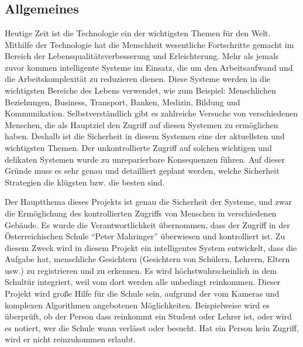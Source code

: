 
\chapter{\docname}
\label{\docname}
\section{Allgemeines}
Heutige Zeit ist die Technologie ein der wichtigsten Themen für den Welt. Mithilfe der Technologie hat die Menschheit wesentliche Fortschritte gemacht im Bereich der Lebensqualitätsverbesserung und Erleichterung. Mehr als jemals zuvor kommen intelligente Systeme im Einsatz, die um den Arbeitsaufwand und die Arbeitskomplexität zu reduzieren dienen. Diese Systeme werden in die wichtigsten Bereiche des Lebens verwendet, wie zum Beispiel: Menschlichen Beziehungen, Business, Transport, Banken, Medizin, Bildung und Kommunikation. Selbstverständlich gibt es zahlreiche Versuche von verschiedenen Menschen, die als Hauptziel den Zugriff auf diesen Systemen zu ermöglichen haben. Deshalb ist die Sicherheit in diesem Systemen eine der aktuellsten und wichtigsten Themen. Der unkontrollierte Zugriff auf solchen wichtigen und delikaten Systemen wurde zu unreparierbare Konsequenzen führen. Auf dieser Gründe muss es sehr genau und detailliert geplant werden, welche Sicherheit Strategien die klügsten bzw. die besten sind.  

Der Hauptthema dieses Projekts ist genau die Sicherheit der Systeme, und zwar die Ermöglichung des kontrollierten Zugriffs von Menschen in verschiedenen Gebäude. Es wurde die Verantwortlichkeit übernommen, dass der Zugriff in der Österreichischen Schule “Peter Mahringer” überwiesen und kontrolliert ist. Zu diesem Zweck wird in diesem Projekt ein intelligentes System entwickelt, dass die Aufgabe hat, menschliche Gesichtern (Gesichtern von Schülern, Lehrern, Eltern usw.) zu registrieren und zu erkennen. Es wird höchstwahrscheinlich in dem Schultür integriert, weil vom dort werden alle unbedingt reinkommen. Dieser Projekt wird große Hilfe für die Schule sein, aufgrund der vom Kameras und komplexen Algorithmen angebotenen Möglichkeiten. Beispielweise wird es überprüft, ob der Person dass reinkommt ein Student oder Lehrer ist, oder wird es notiert, wer die Schule wann verlässt oder besucht. Hat ein Person kein Zugriff, wird er nicht reinzukommen erlaubt.

